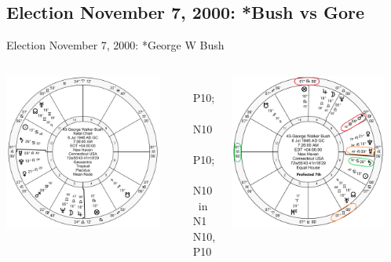 \subsection{Election November 7, 2000: *Bush vs Gore}
\begin{frame}[t]{Election November 7, 2000: *George W Bush}
\small

\begin{columns}[T, onlytextwidth]
\vspace{-1em}
{\includegraphics[width=0.9\textwidth]{charts/GW-Bush.png}}
\fontsize{7pt}{8pt}\selectfont

\Saturn\, \Trine\, P10; \Square\, N10 \\
\Mars\, \Sextile\, P10; \Trine\, N10 \\
\Mercury\, in N1 \Square\, N10, P10

\vspace{-1em}
{\includegraphics[width=0.9\textwidth]{charts/GW-Bush-Prof-7th.png}}
\fontsize{8pt}{9pt}\selectfont


\end{columns}
\end{frame}
